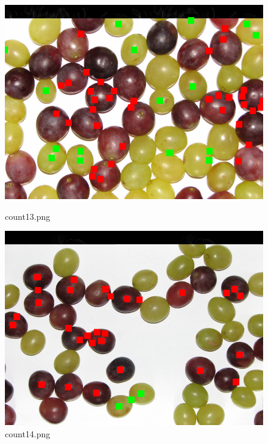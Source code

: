 \documentclass{classrep}
\begin{document}
\begin{figure}
  \begin{minipage}{0.3\linewidth}
    \centering
    \includegraphics[width=\textwidth]{gfx/count13_overlayed.png}
    \caption{count13.png}
    \label{fig:c13}
  \end{minipage}
  \hspace{0.5cm}
  \begin{minipage}{0.3\linewidth}
    \centering
    \includegraphics[width=\textwidth]{gfx/count14_overlayed.png}
    \caption{count14.png}
    \label{fig:c14}
  \end{minipage}
  \begin{minipage}{0.3\linewidth}
    \centering

\end{minipage}
\end{figure}
\end{document}
